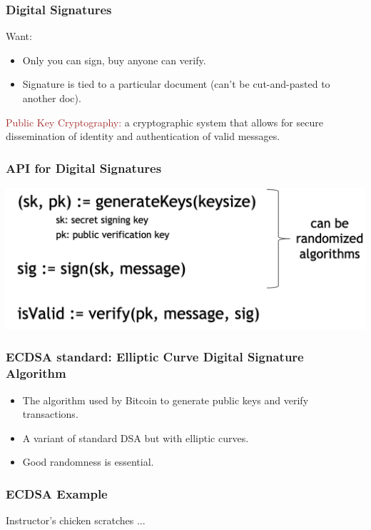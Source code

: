 \documentclass{beamer}
\begin{document}
\begin{frame}
  \frametitle{Digital Signatures}
	Want:
	\begin{itemize}
		\item Only you can sign, buy anyone can verify.
		\item Signature is tied to a particular document (can't be cut-and-pasted to another doc).

	\end{itemize}
	\pause
	\begin{block}{\textcolor{brown}{Public Key Cryptography:}}  a cryptographic system that allows for secure dissemination of identity and authentication of valid messages.
	\end{block}
\end{frame}
\begin{frame}
  \frametitle{API for Digital Signatures}

	\includegraphics[scale=0.5]{api}
\end{frame}
\begin{frame}
  \frametitle{ECDSA standard: Elliptic Curve Digital Signature Algorithm}

	\begin{itemize}
		\item The algorithm used by Bitcoin  to generate public keys and verify transactions.
		\item A variant of standard DSA but with elliptic curves.
		\item Good randomness is essential.
	\end{itemize}
\end{frame}
\begin{frame}
  \frametitle{ECDSA Example}

	Instructor's chicken scratches ... 
\end{frame}
\end{document}
